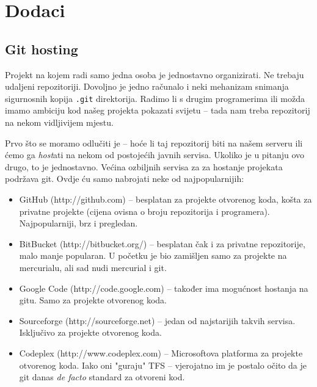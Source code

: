 \chapter*{Dodaci}

%

\section*{Git hosting}

Projekt na kojem radi samo jedna osoba je jednostavno organizirati. 
Ne trebaju udaljeni repozitoriji.
Dovoljno je jedno računalo i neki mehanizam snimanja sigurnosnih kopija \verb+.git+ direktorija.
Radimo li s drugim programerima ili možda imamo ambiciju kod našeg projekta pokazati svijetu -- tada nam treba repozitorij na nekom vidljivijem mjestu.

Prvo što se moramo odlučiti je -- hoće li taj repozitorij biti na našem serveru ili ćemo ga \emph{host}ati na nekom od postojećih javnih servisa.
Ukoliko je u pitanju ovo drugo, to je jednostavno.
Većina ozbiljnih servisa za za hostanje projekata podržava git.
Ovdje ću samo nabrojati neke od najpopularnijih:

\begin{itemize}
    \item GitHub (http://github.com) -- besplatan za projekte otvorenog koda, košta za privatne projekte (cijena ovisna o broju repozitorija i programera). Najpopularniji, brz i pregledan.
    \item BitBucket (http://bitbucket.org/) -- besplatan čak i za privatne repozitorije, malo manje popularan. U početku je bio zamišljen samo za projekte na mercurialu, ali sad nudi mercurial i git.
    \item Google Code (http://code.google.com) -- također ima mogućnost hostanja na gitu. Samo za projekte otvorenog koda.
    \item Sourceforge (http://sourceforge.net) -- jedan od najstarijih takvih servisa. Isključivo za projekte otvorenog koda.
    \item Codeplex (http://www.codeplex.com) -- Microsoftova platforma za projekte otvorenog koda. Iako oni "guraju" TFS -- vjerojatno im je postalo očito da je git danas \emph{de facto} standard za otvoreni kod.
\end{itemize}

